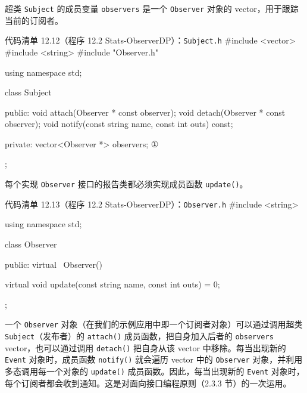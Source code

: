 
超类 \texttt{Subject} 的成员变量 \texttt{observers} 是一个 \texttt{Observer} 对象的 vector，用于跟踪当前的订阅者。

\begin{codeboxt}{代码清单 12.12（程序 12.2 Stats-ObserverDP）：\texttt{Subject.h}}
#include <vector>
#include <string>
#include "Observer.h"

using namespace std;

class Subject
{
public:
    void attach(Observer * const observer);
    void detach(Observer * const observer);
    void notify(const string name, const int outs) const;

private:
    vector<Observer *> observers;    ①
};
\end{codeboxt}
\par

每个实现 \texttt{Observer} 接口的报告类都必须实现成员函数 \texttt{update()}。

\begin{codeboxt}{代码清单 12.13（程序 12.2 Stats-ObserverDP）：\texttt{Observer.\allowbreak{}h}}
#include <string>

using namespace std;

class Observer
{
public:
    virtual ~Observer() {}

    virtual void update(const string name, const int outs) = 0;
};
\end{codeboxt}

一个 \texttt{Observer} 对象（在我们的示例应用中即一个订阅者对象）可以通过调用超类 \texttt{Subject}（发布者）的 \texttt{attach()} 成员函数，把自身加入后者的 \texttt{observers} vector，也可以通过调用 \texttt{detach()} 把自身从该 vector 中移除。每当出现新的 \texttt{Event} 对象时，成员函数 \texttt{notify()} 就会遍历 vector 中的 \texttt{Observer} 对象，并利用多态调用每一个对象的 \texttt{update()} 成员函数。因此，每当出现新的 \texttt{Event} 对象时，每个订阅者都会收到通知。这是对面向接口编程原则（2.3.3 节）的一次运用。

